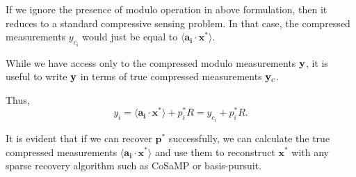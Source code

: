 If we ignore the presence of modulo operation in above formulation, then it reduces to a standard compressive sensing problem. In that case, the compressed measurements $y_{c_i}$ would just be equal to $\langle \mathbf{a_i} \cdot \mathbf{x^*} \rangle$.    %

While we have access only to the compressed modulo measurements $\mathbf{y}$, it is useful to write $\mathbf{y}$ in terms of true compressed measurements $\mathbf{y}_c$. 

Thus,
$$
y_i = \langle \mathbf{a_i} \cdot \mathbf{x^*} \rangle + p^*_iR = y_{c_i}+p^*_iR.
$$

It is evident that if we can recover $\mathbf{p^*}$ successfully, we can calculate the true compressed measurements $\langle \mathbf{a_i} \cdot \mathbf{x^*} \rangle$ and use them to reconstruct $\mathbf{x^*}$ with any sparse recovery algorithm such as CoSaMP or basis-pursuit.
